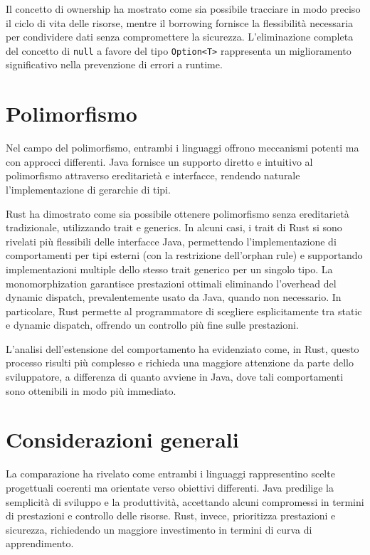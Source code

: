 Il concetto di ownership ha mostrato come sia possibile tracciare in modo preciso il ciclo di vita delle risorse, mentre il borrowing fornisce la flessibilità necessaria per condividere dati senza compromettere la sicurezza. L'eliminazione completa del concetto di \texttt{null} a favore del tipo \texttt{Option<T>} rappresenta un miglioramento significativo nella prevenzione di errori a runtime.

\section{Polimorfismo}
Nel campo del polimorfismo, entrambi i linguaggi offrono meccanismi potenti ma con approcci differenti. Java fornisce un supporto diretto e intuitivo al polimorfismo attraverso ereditarietà e interfacce, rendendo naturale l'implementazione di gerarchie di tipi.

Rust ha dimostrato come sia possibile ottenere polimorfismo senza ereditarietà tradizionale, utilizzando trait e generics. In alcuni casi, i trait di Rust si sono rivelati più flessibili delle interfacce Java, permettendo l'implementazione di comportamenti per tipi esterni (con la restrizione dell'orphan rule) e supportando implementazioni multiple dello stesso trait generico per un singolo tipo. La monomorphization garantisce prestazioni ottimali eliminando l'overhead del dynamic dispatch, prevalentemente usato da Java, quando non necessario. In particolare, Rust permette al programmatore di scegliere esplicitamente tra static e dynamic dispatch, offrendo un controllo più fine sulle prestazioni.

L'analisi dell'estensione del comportamento ha evidenziato come, in Rust, questo processo risulti più complesso e richieda una maggiore attenzione da parte dello sviluppatore, a differenza di quanto avviene in Java, dove tali comportamenti sono ottenibili in modo più immediato.
\section{Considerazioni generali}
La comparazione ha rivelato come entrambi i linguaggi rappresentino scelte progettuali coerenti ma orientate verso obiettivi differenti. Java predilige la semplicità di sviluppo e la produttività, accettando alcuni compromessi in termini di prestazioni e controllo delle risorse. Rust, invece, prioritizza prestazioni e sicurezza, richiedendo un maggiore investimento in termini di curva di apprendimento. 


